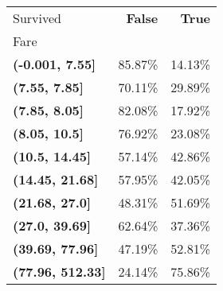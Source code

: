 \begin{tabular}{lrr}
\toprule
Survived & \textbf{False} & \textbf{True} \\
Fare &  &  \\
\midrule
\textbf{(-0.001, 7.55]} & 85.87\% & 14.13\% \\
\textbf{(7.55, 7.85]} & 70.11\% & 29.89\% \\
\textbf{(7.85, 8.05]} & 82.08\% & 17.92\% \\
\textbf{(8.05, 10.5]} & 76.92\% & 23.08\% \\
\textbf{(10.5, 14.45]} & 57.14\% & 42.86\% \\
\textbf{(14.45, 21.68]} & 57.95\% & 42.05\% \\
\textbf{(21.68, 27.0]} & 48.31\% & 51.69\% \\
\textbf{(27.0, 39.69]} & 62.64\% & 37.36\% \\
\textbf{(39.69, 77.96]} & 47.19\% & 52.81\% \\
\textbf{(77.96, 512.33]} & 24.14\% & 75.86\% \\
\bottomrule
\end{tabular}
